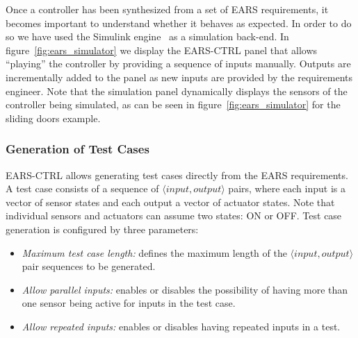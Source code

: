 Once a controller has been synthesized from a set of EARS requirements, it
becomes important to understand whether it behaves as expected. In order to do
so we have used the Simulink engine~\cite{simulink} as a simulation back-end.
In figure~\ref{fig:ears_simulator} we display the \textsf{EARS-CTRL} panel that
allows ``playing'' the controller by providing a sequence of inputs manually.
Outputs are incrementally added to the panel as new inputs are provided by the
requirements engineer. Note that the simulation panel dynamically displays the
sensors of the controller being simulated, as can be seen in
figure~\ref{fig:ears_simulator} for the sliding doors example.
\vspace{-.4cm}
\subsubsection{Generation of Test Cases}
\textsf{EARS-CTRL} allows generating test cases directly from the EARS
requirements. A test case consists of a sequence of $\langle
input, output \rangle$ pairs, where each input is a vector of sensor states
and each output a vector of actuator states. Note that individual sensors and
actuators can assume two states: \textsf{ON} or \textsf{OFF}. Test case
generation is configured by three parameters:\vspace{-.1cm}
\begin{itemize}
  \item \emph{Maximum test case length:} defines the maximum length of the
  $\langle input, output \rangle$ pair sequences to be generated.
  \item \emph{Allow parallel inputs:} enables or disables the possibility of
  having more than one sensor being active for inputs in the test case.
  \item \emph{Allow repeated inputs:} enables or disables having repeated inputs
  in a test.\vspace{-.5cm}
\end{itemize}
